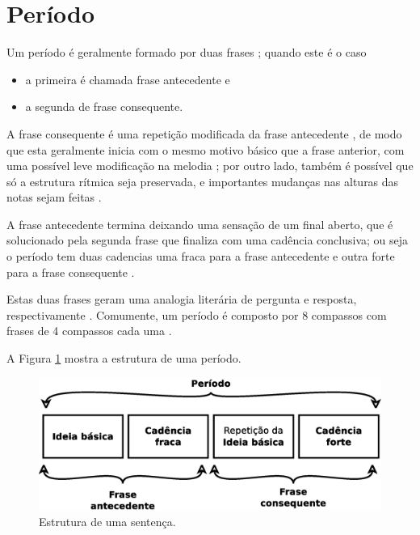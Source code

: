 \section{Período}
\label{sec:Periodo}



Um período é geralmente formado por duas frases \cite[pp. 350]{duckworth2007creative} \cite[pp. 336]{medteoria};
quando este é o caso 
\begin{itemize}  
\item a primeira é chamada frase antecedente e 
\item a segunda de frase consequente.
\end{itemize}

A frase consequente é uma repetição modificada da frase antecedente 
\cite[pp. 53,55]{schoenberg1990fundamentos} \cite[pp. 25,29]{schoenberg1967fundamentals},
de modo que esta geralmente inicia com o mesmo motivo básico que a frase anterior,
com uma possível leve modificação na melodia
\cite[pp. 51]{schoenberg1990fundamentos} \cite[pp. 25]{schoenberg1967fundamentals};
por outro lado, também é possível que só a estrutura rítmica seja preservada,
e importantes mudanças nas alturas das notas sejam feitas
\cite[pp. 57]{schoenberg1990fundamentos} \cite[pp. 30]{schoenberg1967fundamentals}.


A frase antecedente termina deixando uma sensação de um final aberto, 
que é solucionado pela segunda frase que finaliza com uma cadência conclusiva;
ou seja o período tem duas cadencias uma fraca para a frase antecedente e 
outra forte para a frase consequente 
\cite[pp. 350]{duckworth2007creative} \cite[pp. 336]{medteoria} \cite[pp. 1176]{latham2008diccionario}
\cite[pp. 25,29]{schoenberg1967fundamentals}.

Estas duas frases geram uma analogia literária de pergunta e resposta, respectivamente \cite[pp. 336]{medteoria}.
Comumente, um período é composto por 8 compassos com frases de 4 compassos cada uma \cite[pp. 25]{schoenberg1967fundamentals}.

A Figura \ref{fig:periodostruct} mostra a estrutura de uma período. 
\begin{figure}[!h]
  \centering
    \includegraphics[width=\textwidth]{chapters/cap-musica-composer/periodo.eps}
\caption{Estrutura de uma sentença.}
\label{fig:periodostruct}
\end{figure}

